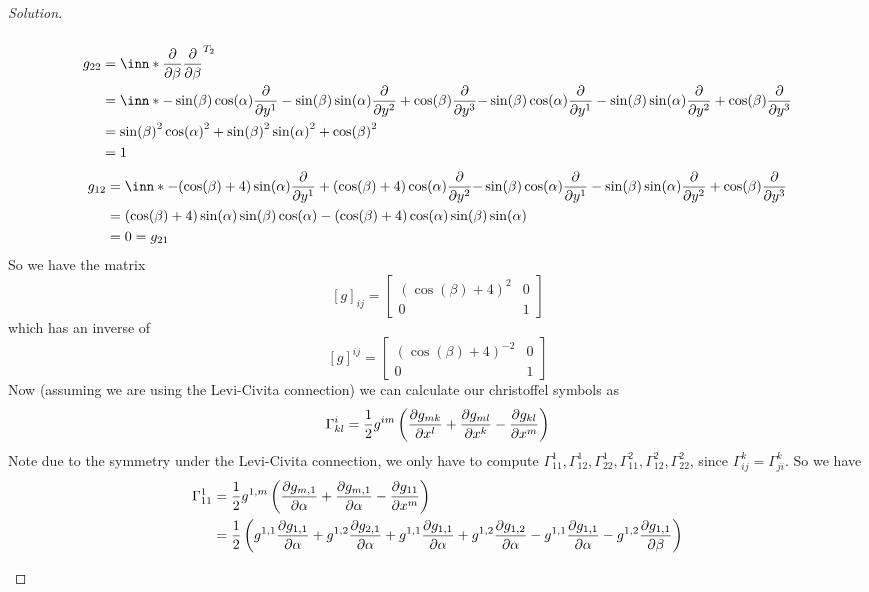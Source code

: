 \documentclass[a4paper]{article}
\begin{document}
\begin{proof}[Solution]
\begin{enumerate}[(a)]
\[      \]
      \[
        \begin{aligned}
        g_{22} &= \inn*{\pdv{\beta}}{\pdv{\beta}}^{T_2} \\
               &= \inn*{-\sin(\beta)\cos(\alpha)\pdv{y^1} - \sin(\beta)\sin(\alpha) \pdv{y^2} + \cos(\beta) \pdv{y^3}}{-\sin(\beta)\cos(\alpha)\pdv{y^1} - \sin(\beta)\sin(\alpha) \pdv{y^2} + \cos(\beta) \pdv{y^3}} \\
               &= \sin(\beta)^2\cos(\alpha)^2 + \sin(\beta)^2\sin(\alpha)^2 + \cos(\beta)^2 \\
               &= 1
        \end{aligned}
      \]
      \[
        \begin{aligned}
          g_{12} &= \inn*{-(\cos(\beta) + 4)\sin(\alpha)\pdv{y^1} + (\cos(\beta) + 4)\cos(\alpha) \pdv{y^2}}{-\sin(\beta)\cos(\alpha)\pdv{y^1} - \sin(\beta)\sin(\alpha) \pdv{y^2} + \cos(\beta) \pdv{y^3}} \\
                 &= (\cos(\beta) + 4)\sin(\alpha)\sin(\beta)\cos(\alpha) - (\cos(\beta) + 4)\cos(\alpha)\sin(\beta)\sin(\alpha) \\
                 &= 0 = g_{21}
        \end{aligned}
      \]
      So we have the matrix
      \[
        [g]_{ij} = 
        \begin{bmatrix}
          (\cos(\beta) + 4)^2 & 0 \\
          0 & 1
        \end{bmatrix}
      \]
      which has an inverse of
      \[
        [g]^{ij} = 
        \begin{bmatrix}
          (\cos(\beta) + 4)^{-2} & 0 \\
          0 & 1
        \end{bmatrix}
      \]
      Now (assuming we are using the Levi-Civita connection) we can calculate our christoffel symbols as
      \[
        \Gamma_{kl}^i  = \frac{1}{2}g^{im} \left(\pdv{g_{mk}}{x^l} + \pdv{g_{ml}}{x^k} - \pdv{g_{kl}}{x^m} \right)
      \]
      Note due to the symmetry under the Levi-Civita connection, we only have to compute $\Gamma_{11}^1, \Gamma_{12}^1, \Gamma_{22}^1, \Gamma_{11}^2, \Gamma_{12}^2, \Gamma_{22}^2$, since $\Gamma_{ij}^k = \Gamma_{ji}^k$. So we have
      \[
        \begin{aligned}
        \Gamma_{11}^1 &= \frac{1}{2} g^{1,m} \left( \pdv{g_{m,1}}{\alpha} + \pdv{g_{m,1}}{\alpha} - \pdv{g_{11}}{x^m} \right) \\
                      &= \frac{1}{2} \left(g^{1,1}\pdv{g_{1,1}}{\alpha} + g^{1,2}\pdv{g_{2,1}}{\alpha} + g^{1,1}\pdv{g_{1,1}}{\alpha} + g^{1,2}\pdv{g_{1,2}}{\alpha} - g^{1,1}\pdv{g_{1,1}}{\alpha} - g^{1,2}\pdv{g_{1,1}}{\beta} \right) \\

\end{aligned}\]
\end{enumerate}
\end{proof}
\end{document}
